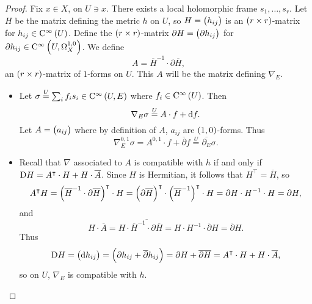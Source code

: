 \begin{proof}
Fix $ x \in X $, on $ U \ni x $. There exists a local holomorphic frame $ s_1, \dots, s_r $. Let $ H $ be the matrix defining the metric $ h $ on $ U $, so $ H = \br{h_{ij}} $ is an $ \br{r \times r} $-matrix for $ h_{ij} \in \C^\infty\br{U} $. Define the $ \br{r \times r} $-matrix $ \partial H = \br{\partial h_{ij}} $ for $ \partial h_{ij} \in \C^\infty\br{U, \Omega_X^{1, 0}} $. We define
$$ A = \overline{H}^{-1} \cdot \partial\overline{H}, $$
an $ \br{r \times r} $-matrix of $ 1 $-forms on $ U $. This $ A $ will be the matrix defining $ \nabla_E $.
\begin{itemize}
\item Let $ \sigma \overset{U}{=} \sum_i f_is_i \in \C^\infty\br{U, E} $ where $ f_i \in \C^\infty\br{U} $. Then
$$ \nabla_E\sigma \overset{U}{=} A \cdot f + \mathrm{d} f. $$
Let $ A = \br{a_{ij}} $ where by definition of $ A $, $ a_{ij} $ are $ \br{1, 0} $-forms. Thus
$$ \nabla_E^{0, 1}\sigma = A^{0, 1} \cdot f + \overline{\partial}f \overset{U}{=} \overline{\partial_E}\sigma. $$
\item Recall that $ \nabla $ associated to $ A $ is compatible with $ h $ if and only if $ \mathrm{D} H = A^\intercal \cdot H + H \cdot \overline{A} $. Since $ H $ is Hermitian, it follows that $ H^\intercal = \overline{H} $, so
$$ A^\intercal H = \br{\overline{H}^{-1} \cdot \partial\overline{H}}^\intercal \cdot H = \br{\partial\overline{H}}^\intercal \cdot \br{\overline{H}^{-1}}^\intercal \cdot H = \partial H \cdot H^{-1} \cdot H = \partial H, $$
and
$$ H \cdot \overline{A} = H \cdot \overline{\overline{H}^{-1} \cdot \partial\overline{H}} = H \cdot H^{-1} \cdot \overline{\partial} H = \overline{\partial} H. $$
Thus
$$ \D H = \br{\d h_{ij}} = \br{\partial h_{ij} + \overline{\partial}h_{ij}} = \partial H + \overline{\partial H} = A^\intercal \cdot H + H \cdot \overline{A}, $$
so on $ U $, $ \nabla_E $ is compatible with $ h $.

\pagebreak



\end{itemize}
\end{proof}
